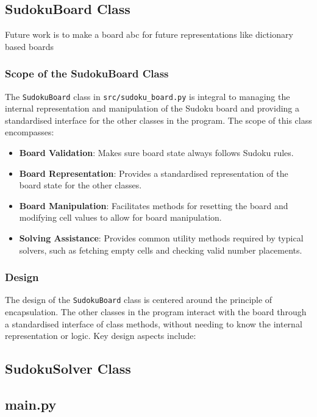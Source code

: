 \documentclass[11pt]{article}
\begin{document}
\subsection{SudokuBoard Class}
Future work is to make a board abc for future representations like dictionary based boards

\subsubsection{Scope of the SudokuBoard Class}
The \texttt{SudokuBoard} class in \texttt{src/sudoku\_board.py} is integral to managing the internal representation and manipulation of the Sudoku board and providing a standardised interface for the other classes in the program. The scope of this class encompasses:

\begin{itemize}
    \item \textbf{Board Validation}: Makes sure board state always follows Sudoku rules. 
    \item \textbf{Board Representation}: Provides a standardised representation of the board state for the other classes. 
    \item \textbf{Board Manipulation}: Facilitates methods for resetting the board and modifying cell values to allow for board manipulation.
    \item \textbf{Solving Assistance}: Provides common utility methods required by typical solvers, such as fetching empty cells and checking valid number placements.

\end{itemize}
\subsubsection{Design}
The design of the \texttt{SudokuBoard} class is centered around the principle of encapsulation. The other classes in the program interact with the board through a standardised interface of class methods, without needing to know the internal representation or logic. Key design aspects include:


\subsection{SudokuSolver Class}

\subsection{main.py}
\end{document}
